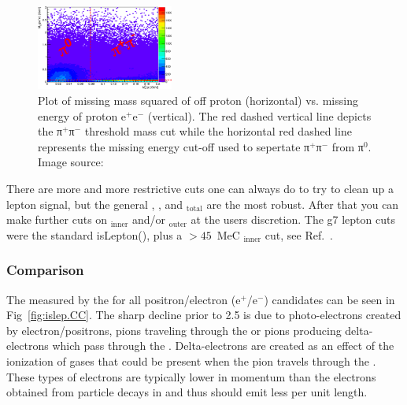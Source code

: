 \begin{figure}\begin{center}
\includegraphics[width=0.4\textwidth]{figures/lepton/Lepfeature_cuts.eps}
\caption[Cuts Applied to Isolate π$^0$ and π$^+$ π$^-$ for  Validation]{\label{fig:islep.cuts}Plot of missing mass squared of off proton (horizontal) vs. missing energy of proton e$^+$e$^-$ (vertical). The red dashed vertical line depicts the π$^+$π$^-$ threshold mass cut while the horizontal red dashed line represents the missing energy cut-off used to sepertate π$^+$π$^-$ from π$^0$.  Image source:~\cite{clas.thesis.kunkel}}
\end{center}\end{figure}

\begin{v2}
There are more and more restrictive cuts one can always do to try to clean up a lepton signal, but the general , , and $_\mathrm{total}$ are the most robust. After that you can make further cuts on $_\mathrm{inner}$ and/or $_\mathrm{outer}$ at the users discretion. The g7 lepton cuts were the standard isLepton(), plus a $>45$~MeC $_\mathrm{inner}$ cut, see Ref.~\cite{clas.nasseripour}.
\end{v2}

\subsubsection{\label{sec:data.lepton.cc} Comparison}

The  measured by the  for all positron/electron (e$^+$/e$^-$) candidates can be seen in Fig~\ref{fig:islep.CC}. The sharp decline prior to 2.5  is due to photo-electrons created by electron/positrons, pions traveling through the  or pions producing delta-electrons which pass through the . Delta-electrons are created as an effect of the ionization of gases that could be present when the pion travels through the . These types of electrons are typically lower in momentum than the electrons obtained from particle decays in  and thus should emit less  per unit length.

